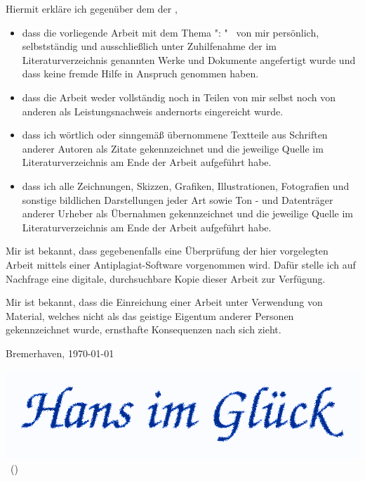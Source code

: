 \thispagestyle{empty}

Hiermit erkläre ich gegenüber dem \sDepartment  der \sUni,

\begin{itemize}
	\item dass die vorliegende Arbeit mit dem Thema "\sTitle : \sCaption" \ von mir
	persönlich, selbstständig und ausschließlich unter Zuhilfenahme der im Literaturverzeichnis genannten Werke und
	Dokumente angefertigt wurde und dass keine fremde Hilfe in Anspruch genommen haben.
	\item dass die Arbeit weder vollständig noch in Teilen von mir selbst noch von anderen als Leistungsnachweis andernorts eingereicht wurde.
	\item dass ich wörtlich oder sinngemäß übernommene Textteile aus Schriften anderer Autoren als Zitate
	gekennzeichnet und die jeweilige Quelle im Literaturverzeichnis am Ende der Arbeit aufgeführt habe.
	\item dass ich alle Zeichnungen, Skizzen, Grafiken, Illustrationen, Fotografien und sonstige bildlichen	Darstellungen jeder Art sowie Ton - und Datenträger anderer Urheber als Übernahmen gekennzeichnet und die jeweilige Quelle im Literaturverzeichnis am Ende der Arbeit aufgeführt habe.
\end{itemize}

Mir ist bekannt, dass gegebenenfalls eine Überprüfung der hier vorgelegten Arbeit mittels einer
Antiplagiat-Software vorgenommen wird. Dafür stelle ich auf Nachfrage eine digitale, durchsuchbare Kopie dieser Arbeit zur Verfügung.

Mir ist bekannt, dass die Einreichung einer Arbeit unter Verwendung von Material, welches nicht als das geistige Eigentum anderer Personen gekennzeichnet wurde, ernsthafte Konsequenzen nach sich zieht.

\vspace {0.5cm}

Bremerhaven, \today \qquad

\begin{minipage}[hbt]{3in}
\vspace {0.5cm}
	\includegraphics[scale=0.15]{images/signatur.png} \\
	\sName \ (\sMtrNr)
\end{minipage}